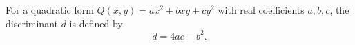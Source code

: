 For a quadratic form $Q(x, y) = ax^2 + bxy + cy^2$ with real coefficients $a, b, c$, the discriminant $d$ is defined by
$$d = 4ac - b^2.$$
